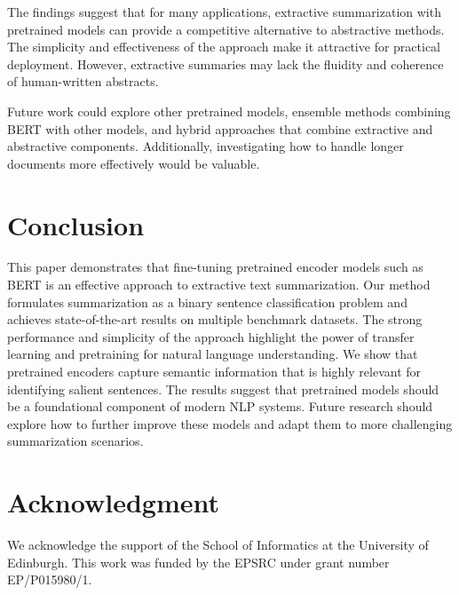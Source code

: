 \documentclass[conference]{IEEEtran}
\begin{document}
The findings suggest that for many applications, extractive summarization with pretrained models can provide a competitive alternative to abstractive methods. The simplicity and effectiveness of the approach make it attractive for practical deployment. However, extractive summaries may lack the fluidity and coherence of human-written abstracts.

Future work could explore other pretrained models, ensemble methods combining BERT with other models, and hybrid approaches that combine extractive and abstractive components. Additionally, investigating how to handle longer documents more effectively would be valuable.

\section{Conclusion}

This paper demonstrates that fine-tuning pretrained encoder models such as BERT is an effective approach to extractive text summarization. Our method formulates summarization as a binary sentence classification problem and achieves state-of-the-art results on multiple benchmark datasets. The strong performance and simplicity of the approach highlight the power of transfer learning and pretraining for natural language understanding. We show that pretrained encoders capture semantic information that is highly relevant for identifying salient sentences. The results suggest that pretrained models should be a foundational component of modern NLP systems. Future research should explore how to further improve these models and adapt them to more challenging summarization scenarios.

\section*{Acknowledgment}

We acknowledge the support of the School of Informatics at the University of Edinburgh. This work was funded by the EPSRC under grant number EP/P015980/1.
\end{document}
